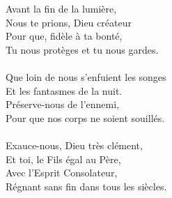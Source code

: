 Avant la fin de la lumière,\\
Nous te prions, Dieu créateur\\
Pour que, fidèle à ta bonté,\\
Tu nous protèges et tu nous gardes.\\
\\
Que loin de nous s'enfuient les songes\\
Et les fantasmes de la nuit.\\
Préserve-nous de l'ennemi,\\
Pour que nos corps ne soient souillés.\\
\\
Exauce-nous, Dieu très clément,\\
Et toi, le Fils égal au Père,\\
Avec l’Esprit Consolateur,\\
Régnant sans fin dans tous les siècles.